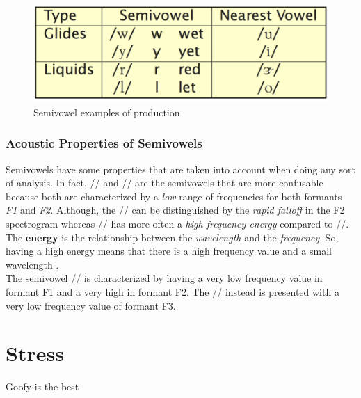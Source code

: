 \begin{figure}[!ht]
    \centering
    \includegraphics[scale=0.5]{Figures/semivowel_examples.png}
    \caption{Semivowel examples of production \cite{mit_phonetics}}
    \label{fig:semivowel_ex}
\end{figure}


\subsubsection{Acoustic Properties of Semivowels}
\label{ssub:Acousitc Properties of Semivowels}
Semivowels have some properties that are taken into account when doing any sort of analysis. In fact, // and // are the semivowels that are more confusable because both are characterized by a \textit{low} range of frequencies for both formants \textit{F1} and \textit{F2}. Although, the // can be distinguished by the \textit{rapid falloff} in the F2 spectrogram whereas // has more often a \textit{high frequency energy} compared to //. The \textbf{energy} is the relationship between the \textit{wavelength} and the \textit{frequency}. So, having a high energy means that there is a high frequency value and a small wavelength \cite{energy_relationship}. \\
\noindent The semivowel // is characterized by having a very low frequency value in formant F1 and a very high in formant F2. The // instead is presented with a very low frequency value of formant F3. \\

\section{Stress}
\label{sec:stress}

Goofy is the best

